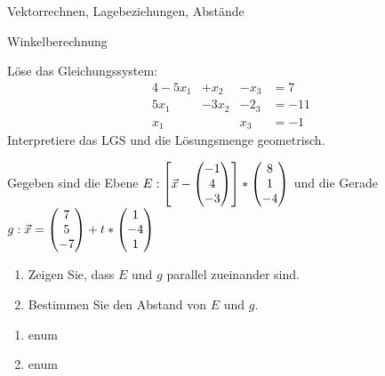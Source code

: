 

\newcommand{\vektor}[1]{\ensuremath\begin{pmatrix} #1 \end{pmatrix}}


\begin{inhalt}
	\item Vektorrechnen, Lagebeziehungen, Abstände
	\item Winkelberechnung
\end{inhalt}

Löse das Gleichungssystem:
\begin{alignat*}{4}
	-5x_1& +x_2& -x_3& = 7\\
	5x_1&  -3x_2& -2_3& = -11\\
	x_1& & x_3& =-1
\end{alignat*}
Interpretiere das LGS und die Lösungsmenge geometrisch.

Gegeben sind die Ebene $E: \left[ \vec x -  \vektor{-1 \\ 4\\ -3}\right]*\vektor{8\\ 1 \\-4}$ und die Gerade $g: \vec x=\vektor{7\\5\\-7}+t*\vektor{1\\-4\\1}$
\begin{enumerate}
	\item Zeigen Sie, dass $E$ und $g$ parallel zueinander sind.
	\item Bestimmen Sie den Abstand von $E$ und $g$.
\end{enumerate}

\begin{enumerate}
	\item enum
	\item	enum
\end{enumerate}


